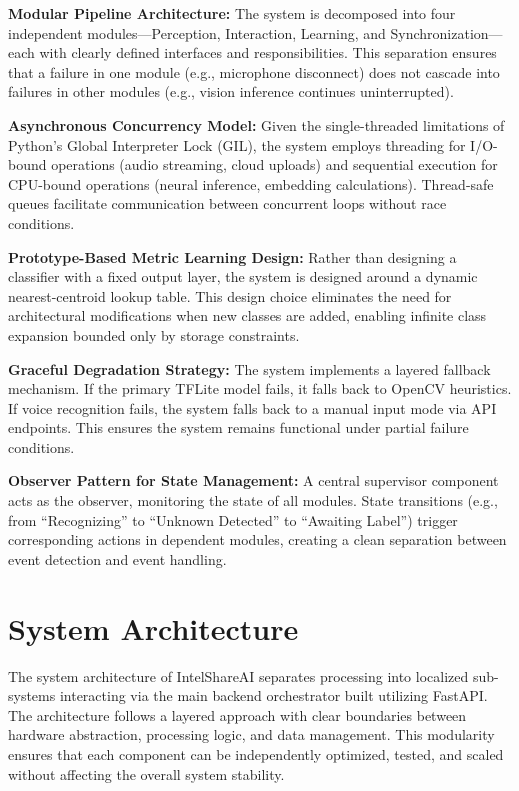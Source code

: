 \documentclass[12pt,a4paper]{report}
\begin{document}
\textbf{Modular Pipeline Architecture:} The system is decomposed into four independent modules---Perception, Interaction, Learning, and Synchronization---each with clearly defined interfaces and responsibilities. This separation ensures that a failure in one module (e.g., microphone disconnect) does not cascade into failures in other modules (e.g., vision inference continues uninterrupted).

\textbf{Asynchronous Concurrency Model:} Given the single-threaded limitations of Python's Global Interpreter Lock (GIL), the system employs threading for I/O-bound operations (audio streaming, cloud uploads) and sequential execution for CPU-bound operations (neural inference, embedding calculations). Thread-safe queues facilitate communication between concurrent loops without race conditions.

\textbf{Prototype-Based Metric Learning Design:} Rather than designing a classifier with a fixed output layer, the system is designed around a dynamic nearest-centroid lookup table. This design choice eliminates the need for architectural modifications when new classes are added, enabling infinite class expansion bounded only by storage constraints.

\textbf{Graceful Degradation Strategy:} The system implements a layered fallback mechanism. If the primary TFLite model fails, it falls back to OpenCV heuristics. If voice recognition fails, the system falls back to a manual input mode via API endpoints. This ensures the system remains functional under partial failure conditions.

\textbf{Observer Pattern for State Management:} A central supervisor component acts as the observer, monitoring the state of all modules. State transitions (e.g., from ``Recognizing'' to ``Unknown Detected'' to ``Awaiting Label'') trigger corresponding actions in dependent modules, creating a clean separation between event detection and event handling.

\section{System Architecture}
The system architecture of IntelShareAI separates processing into localized sub-systems interacting via the main backend orchestrator built utilizing FastAPI. The architecture follows a layered approach with clear boundaries between hardware abstraction, processing logic, and data management. This modularity ensures that each component can be independently optimized, tested, and scaled without affecting the overall system stability.
\end{document}
